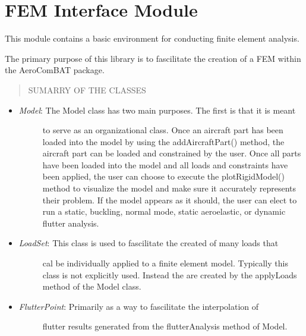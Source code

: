 \documentclass[letterpaper,10pt,english]{sphinxmanual}
\begin{document}
\section{FEM Interface Module}
\label{FEM:module-AeroComBAT.FEM}\label{FEM::doc}\label{FEM:fem-interface-module}
This module contains a basic environment for conducting finite element analysis.

The primary purpose of this library is to fascilitate the creation of a FEM
within the AeroComBAT package.
\begin{quote}\begin{description}
\item[{SUMARRY OF THE CLASSES}] \leavevmode
\end{description}\end{quote}
\begin{itemize}
\item {} \begin{description}
\item[{\emph{Model}: The Model class has two main purposes. The first is that it is meant}] \leavevmode
to serve as an organizational class. Once an aircraft part has been loaded
into the model by using the addAircraftPart() method, the aircraft part
can be loaded and constrained by the user. Once all parts have been loaded
into the model and all loads and constraints have been applied, the user
can choose to execute the plotRigidModel() method to visualize the model
and make sure it accurately represents their problem. If the model appears
as it should, the user can elect to run a static, buckling, normal mode,
static aeroelastic, or dynamic flutter analysis.

\end{description}

\item {} \begin{description}
\item[{\emph{LoadSet}: This class is used to fascilitate the created of many loads that}] \leavevmode
cal be individually applied to a finite element model. Typically this class
is not explicitly used. Instead the are created by the applyLoads method of
the Model class.

\end{description}

\item {} \begin{description}
\item[{\emph{FlutterPoint}: Primarily as a way to fascilitate the interpolation of}] \leavevmode
flutter results generated from the flutterAnalysis method of Model.

\end{description}

\end{itemize}
\end{document}
